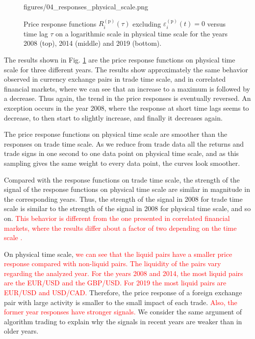 \begin{figure}[htbp]
    {figures/04_responses_physical_scale.png}
    \caption{Price response functions
             $R^{\left(\textrm{p}\right)}_{i}\left(\tau\right)$ excluding
             $\varepsilon^{\left(\textrm{p}\right)}_{i}\left(t\right) = 0$ versus time
             lag $\tau$ on a logarithmic scale in physical time scale for the
             years 2008 (top), 2014 (middle) and 2019 (bottom).}
    \label{fig:response_function_physical_scale}
\end{figure}
The results shown in Fig. \ref{fig:response_function_physical_scale} are the
price response functions on physical time scale for three different years. The
results show approximately the same behavior observed in currency exchange
pairs in trade time scale, and in correlated financial markets, where we can
see that an increase to a maximum is followed by a decrease. Thus again, the
trend in the price responses is eventually reversed. An exception occurs in the
year 2008, where the response at short time lags seems to decrease, to then
start to slightly increase, and finally it decreases again.

The price response functions on physical time scale are smoother than the
responses on trade time scale. As we reduce from trade data all the returns and
trade signs in one second to one data point on physical time scale, and as this
sampling gives the same weight to every data point, the curves look smoother.

Compared with the response functions on trade time scale, the strength of the
signal of the response functions on physical time scale are similar in
magnitude in the corresponding years. Thus, the strength of the signal in 2008
for trade time scale is similar to the strength of the signal in 2008 for
physical time scale, and so on. \textcolor{red}{This behavior is different from the one presented
in correlated financial markets, where the results differ about a factor of
two depending on the time scale \cite{my_paper_response_financial}.}

On physical time scale, \textcolor{red}{we can see that the liquid pairs have a smaller price
response compared with non-liquid pairs. The liquidity of the pairs vary regarding
the analyzed year. For the years 2008 and 2014, the most liquid pairs are the EUR/USD
and the GBP/USD. For 2019 the most liquid pairs are EUR/USD and USD/CAD.} Therefore, the price response of a
foreign exchange pair with large activity is smaller to the small impact of
each trade. \textcolor{red}{Also, the former year responses have stronger signals.} We consider
the same argument of algorithm trading to explain why the signals in recent
years are weaker than in older years.
